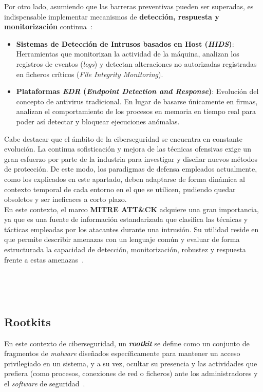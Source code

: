Por otro lado, asumiendo que las barreras preventivas pueden ser superadas, es indispensable implementar mecanismos de \textbf{detección, respuesta y monitorización} continua~\cite{nist_detection}:
\begin{itemize}
    \item \textbf{Sistemas de Detección de Intrusos basados en Host (\textit{HIDS})}: Herramientas que monitorizan la actividad de la máquina, analizan los registros de eventos (\textit{logs}) y detectan alteraciones no autorizadas registradas en ficheros críticos (\textit{File Integrity Monitoring}).
    \item \textbf{Plataformas \textit{EDR} (\textit{Endpoint Detection and Response})}: Evolución del concepto de antivirus tradicional. En lugar de basarse únicamente en firmas, analizan el comportamiento de los procesos en memoria en tiempo real para poder así detectar y bloquear ejecuciones anómalas.
\end{itemize}

Cabe destacar que el ámbito de la ciberseguridad se encuentra en constante evolución. La continua sofisticación y mejora de las técnicas ofensivas exige un gran esfuerzo por parte de la industria para investigar y diseñar nuevos métodos de protección.
De este modo, los paradigmas de defensa empleados actualmente, como los explicados en este apartado, deben adaptarse de forma dinámica al contexto temporal de cada entorno en el que se utilicen, pudiendo quedar obsoletos y ser ineficaces a corto plazo.\\

En este contexto, el marco \textbf{MITRE ATT\&CK} adquiere una gran importancia, ya que es una fuente de información estandarizada que clasifica las técnicas y tácticas empleadas por los atacantes durante una intrusión.
Su utilidad reside en que permite describir amenazas con un lenguaje común y evaluar de forma estructurada la capacidad de detección, monitorización, robustez y respuesta frente a estas amenazas~\cite{mitre_attack}.

\

\

\subsection{Rootkits}
\label{sec:rootkits}

En este contexto de ciberseguridad, un \textbf{\textit{rootkit}} se define como un conjunto de fragmentos de \textit{malware} diseñados específicamente para mantener un acceso privilegiado en un sistema, y a su vez, ocultar su presencia y las actividades que prefiera (como procesos, conexiones de red o ficheros) ante los administradores y el \textit{software} de seguridad~\cite{rootkits}.\\

